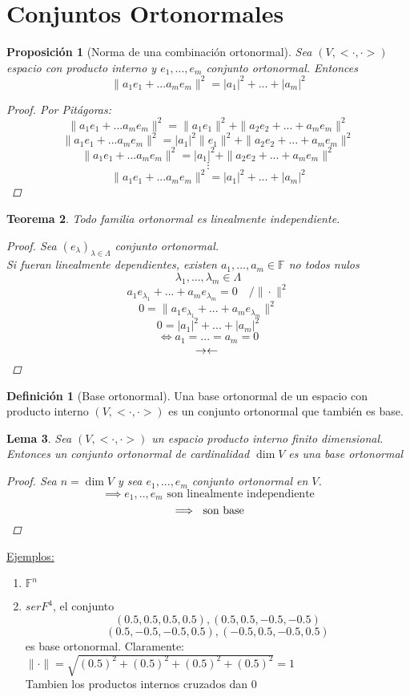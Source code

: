 \documentclass[11pt]{book}
\newcommand{\set}[1]{\mathbb{#1}}
\newcommand{\contr}{\rightarrow\leftarrow}
\newtheorem{thm}{Teorema}[section]
\newtheorem{lem}[thm]{Lema}
\newtheorem{prop}[thm]{Proposición}
\theoremstyle{definition}
\newtheorem{defn}{Definición}[section]
\begin{document}
\section{Conjuntos Ortonormales}

\begin{prop}[Norma de una combinación ortonormal]
	Sea $(V,<\cdot,\cdot>)$ espacio con producto interno y $e_1,...,e_m$ conjunto ortonormal. Entonces
	\[\|a_1e_1+...a_me_m\|^2=|a_1|^2+...+|a_m|^2\]
	\begin{proof}
		Por Pitágoras:
		\[\|a_1e_1+...a_me_m\|^2=\|a_1e_1\|^2+\|a_2e_2+...+a_me_m\|^2\]
		\[\|a_1e_1+...a_me_m\|^2=|a_1|^2\|e_1\|^2+\|a_2e_2+...+a_me_m\|^2\]
		\[\|a_1e_1+...a_me_m\|^2=|a_1|^2+\|a_2e_2+...+a_me_m\|^2\]
		\[\vdots\]
		\[\|a_1e_1+...a_me_m\|^2=|a_1|^2+...+|a_m|^2\]
	\end{proof}
\end{prop}
\begin{thm}
	Todo familia ortonormal es linealmente independiente.
	\begin{proof}
		Sea $(e_\lambda)_{\lambda\in\Lambda}$ conjunto ortonormal.\\
		Si fueran linealmente dependientes, existen $a_1,...,a_m\in\set{F}$ no todos nulos
		\[\lambda_1,...,\lambda_m\in\Lambda\]
		\[a_1e_{\lambda_1}+...+a_me_{\lambda_m}=0\quad /\|\cdot\|^2\]
		\[0=\|a_1e_{\lambda_1}+...+a_me_{\lambda_m}\|^2\]
		\[0=|a_1|^2+...+|a_m|^2\]
		\[\iff a_1=...=a_m=0\]
		\[\contr\qedhere\]
	\end{proof}
\end{thm}
\begin{defn}[Base ortonormal]
	Una base ortonormal de un espacio con producto interno $(V,<\cdot,\cdot>)$ es un conjunto ortonormal que también es base.
\end{defn}
\begin{lem}
	Sea $(V,<\cdot,\cdot>)$ un espacio producto interno finito dimensional. Entonces un conjunto ortonormal de cardinalidad $\dim V$ es una base ortonormal
	\begin{proof}
		Sea $n=\dim V$ y sea $e_1,...,e_m$ conjunto ortonormal en $V$.
		\[\implies e_1,..,e_m\textrm{ son linealmente independiente}\]
		\[\implies\textrm{ son base}\qedhere\]
	\end{proof}
\end{lem}
\underline{Ejemplos:}
\begin{enumerate}
	\item $\set{F}^n$

	\item $ser{F}^4$, el conjunto
	      \[(0.5,0.5,0.5,0.5),(0.5,0.5,-0.5,-0.5)\]
	      \[(0.5,-0.5,-0.5,0.5),(-0.5,0.5,-0.5,0.5)\]
	      es base ortonormal.
	      Claramente: $\|\cdot\|=\sqrt{(0.5)^2+(0.5)^2+(0.5)^2+(0.5)^2}=1$\\
	      Tambien los productos internos cruzados dan 0
\end{enumerate}
\end{document}
